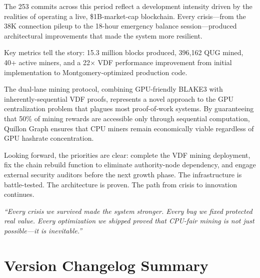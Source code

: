 \documentclass[12pt,a4paper]{article}
\begin{document}
The 253 commits across this period reflect a development intensity driven by the realities of operating a live, \$1B-market-cap blockchain. Every crisis---from the 38K connection pileup to the 18-hour emergency balance session---produced architectural improvements that made the system more resilient.

Key metrics tell the story: 15.3 million blocks produced, 396{,}162 QUG mined, 40+ active miners, and a 22$\times$ VDF performance improvement from initial implementation to Montgomery-optimized production code.

The dual-lane mining protocol, combining GPU-friendly BLAKE3 with inherently-sequential VDF proofs, represents a novel approach to the GPU centralization problem that plagues most proof-of-work systems. By guaranteeing that 50\% of mining rewards are accessible only through sequential computation, Quillon Graph ensures that CPU miners remain economically viable regardless of GPU hashrate concentration.

Looking forward, the priorities are clear: complete the VDF mining deployment, fix the chain rebuild function to eliminate authority-node dependency, and engage external security auditors before the next growth phase. The infrastructure is battle-tested. The architecture is proven. The path from crisis to innovation continues.

\vspace{1cm}
\begin{center}
\textit{``Every crisis we survived made the system stronger. Every bug we fixed protected real value. Every optimization we shipped proved that CPU-fair mining is not just possible---it is inevitable.''}
\end{center}

\appendix

\section{Version Changelog Summary}
\end{document}

